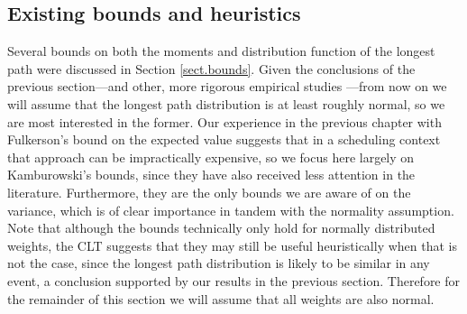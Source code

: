 \documentclass[12pt]{article}
\begin{document}

\subsection{Existing bounds and heuristics}
\label{subsect.results_existing}

Several bounds on both the moments and distribution function of the longest path were discussed in Section \ref{sect.bounds}. Given the conclusions of the previous section---and other, more rigorous empirical studies \cite{can16,lud01}---from now on we will assume that the longest path distribution is at least roughly normal, so we are most interested in the former. Our experience in the previous chapter with Fulkerson's bound on the expected value suggests that in a scheduling context that approach can be impractically expensive, so we focus here largely on Kamburowski's bounds, since they have also received less attention in the literature. Furthermore, they are the only bounds we are aware of on the variance, which is of clear importance in tandem with the normality assumption. Note that although the bounds technically only hold for normally distributed weights, the CLT suggests that they may still be useful heuristically when that is not the case, since the longest path distribution is likely to be similar in any event, a conclusion supported by our results in the previous section. Therefore for the remainder of this section we will assume that all weights are also normal.
\end{document}
